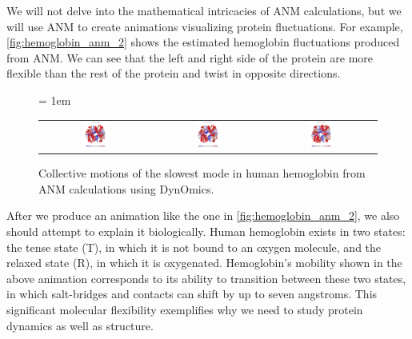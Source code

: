We will not delve into the mathematical intricacies of ANM calculations, but we will use ANM to create animations visualizing protein fluctuations. For example, \autoref{fig:hemoglobin_anm_2} shows the estimated hemoglobin fluctuations produced from ANM. We can see that the left and right side of the protein are more flexible than the rest of the protein and twist in opposite directions.

\begin{figure}[h]
	\centering
	\tabcolsep = 1em
	\mySfFamily
	\begin{tabular}{c c c}
		\includegraphics[width = 0.25\textwidth]{../images/hemoglobin_animation1.png} & \includegraphics[width = 0.25\textwidth]{../images/hemoglobin_animation2.png} & \includegraphics[width = 0.25\textwidth]{../images/hemoglobin_animation3.png}
	\end{tabular}
	\caption{Collective motions of the slowest mode in human hemoglobin from ANM calculations using DynOmics.}
	\label{fig:hemoglobin_anm_2}
\end{figure}


After we produce an animation like the one in \autoref{fig:hemoglobin_anm_2}, we also should attempt to explain it biologically. Human hemoglobin exists in two states: the tense state (T), in which it is not bound to an oxygen molecule, and the relaxed state (R), in which it is oxygenated. Hemoglobin's mobility shown in the above animation corresponds to its ability to transition between these two states, in which salt-bridges and contacts can shift by up to seven angstroms. This significant molecular flexibility exemplifies why we need to study protein dynamics as well as structure.

